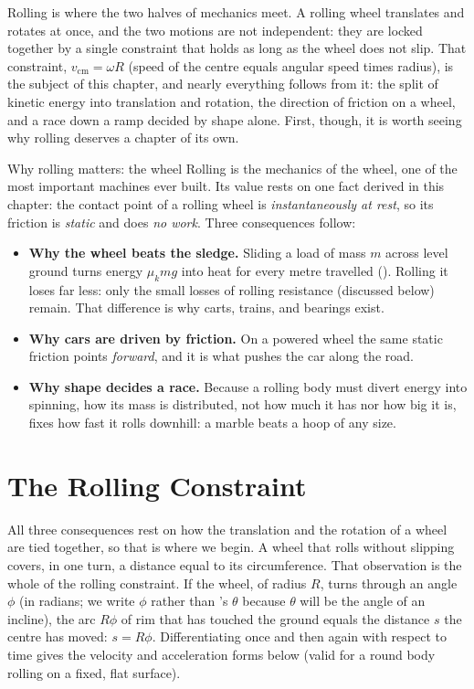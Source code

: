 
Rolling is where the two halves of mechanics meet. A rolling wheel translates and rotates at once, and the
two motions are not independent: they are locked together by a single constraint that holds as long as the
wheel does not slip. That constraint, $v_{\text{cm}}=\omega R$ (speed of the centre equals angular speed
times radius), is the subject of this chapter, and nearly everything follows from it: the split of kinetic
energy into translation and rotation, the direction of friction on a wheel, and a race down a ramp decided
by shape alone. First, though, it is worth seeing why rolling deserves a chapter of its own.

\begin{motivbox}{Why rolling matters: the wheel}
Rolling is the mechanics of the wheel, one of the most important machines ever built. Its value rests on one fact derived in this chapter: the contact point of a rolling wheel
is \emph{instantaneously at rest}, so its friction is \emph{static} and does \emph{no work}. Three
consequences follow:
\begin{itemize}
\item \textbf{Why the wheel beats the sledge.} Sliding a load of mass $m$ across level ground turns energy
$\mu_k mg$ into heat for every metre travelled (). Rolling it loses far less: only the
small losses of rolling resistance (discussed below) remain. That difference is why carts, trains, and
bearings exist.
\item \textbf{Why cars are driven by friction.} On a powered wheel the same static friction points
\emph{forward}, and it is what pushes the car along the road.
\item \textbf{Why shape decides a race.} Because a rolling body must divert energy into spinning, how its
mass is distributed, not how much it has nor how big it is, fixes how fast it rolls downhill: a marble
beats a hoop of any size.
\end{itemize}
\end{motivbox}

\section{The Rolling Constraint}

All three consequences rest on how the translation and the rotation of a wheel are tied together, so that is
where we begin. A wheel that rolls without slipping covers, in one turn, a distance equal to its
circumference. That observation is the whole of the rolling constraint. If the wheel, of radius $R$, turns
through an angle $\phi$ (in radians; we write $\phi$ rather than 's $\theta$ because
$\theta$ will be the angle of an incline), the arc $R\phi$ of rim that has touched the ground equals the
distance $s$ the centre has moved: $s=R\phi$. Differentiating once and then again with respect to time gives
the velocity and acceleration forms below (valid for a round body rolling on a fixed, flat surface).

